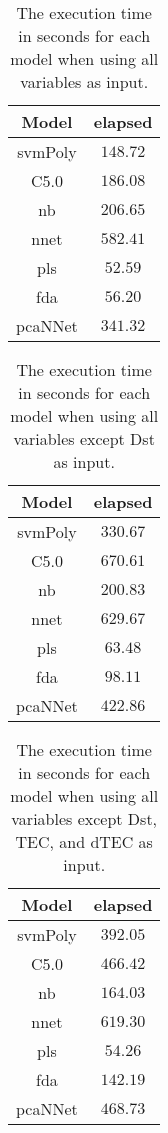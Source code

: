 \begin{table}[!ht]
	\centering
	\begin{tabular}{|c|c|}
		\hline
		Model & elapsed \\ \hline
		svmPoly & $148.72$ \\ \hline
		C5.0 & $186.08$ \\ \hline
		nb & $206.65$ \\ \hline
		nnet & $582.41$ \\ \hline
		pls & $52.59$ \\ \hline
		fda & $56.20$ \\ \hline
		pcaNNet & $341.32$ \\ \hline
	\end{tabular}
	\caption{The execution time in seconds for each model when using all variables as input.}
	\label{tab:time:all:total}
\end{table}

\begin{table}[!ht]
	\centering
	\begin{tabular}{|c|c|}
		\hline
		Model & elapsed \\ \hline
		svmPoly & $330.67$ \\ \hline
		C5.0 & $670.61$ \\ \hline
		nb & $200.83$ \\ \hline
		nnet & $629.67$ \\ \hline
		pls & $63.48$ \\ \hline
		fda & $98.11$ \\ \hline
		pcaNNet & $422.86$ \\ \hline
	\end{tabular}
	\caption{The execution time in seconds for each model when using all variables except Dst as input.}
	\label{tab:time:noDst:total}
\end{table}

\begin{table}[!ht]
	\centering
	\begin{tabular}{|c|c|}
		\hline
		Model & elapsed \\ \hline
		svmPoly & $392.05$ \\ \hline
		C5.0 & $466.42$ \\ \hline
		nb & $164.03$ \\ \hline
		nnet & $619.30$ \\ \hline
		pls & $54.26$ \\ \hline
		fda & $142.19$ \\ \hline
		pcaNNet & $468.73$ \\ \hline
	\end{tabular}
	\caption{The execution time in seconds for each model when using all variables except Dst, TEC, and dTEC as input.}
	\label{tab:time:noTEC:total}
\end{table}

